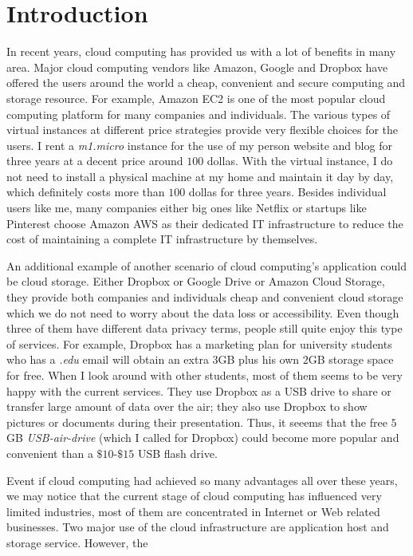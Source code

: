 \section{Introduction}
In recent years, cloud computing has provided us with a lot of benefits in many area. Major cloud computing vendors like Amazon, Google and Dropbox have offered the users around the world a cheap, convenient and secure computing and storage resource. For example, Amazon EC2 is one of the most popular cloud computing platform for many companies and individuals. The various types of virtual instances at different price strategies provide very flexible choices for the users. I rent a \emph{m1.micro} instance for the use of my person website and blog for three years at a decent price around $100$ dollas. With the virtual instance, I do not need to install a physical machine at my home and maintain it day by day, which definitely costs more than $100$ dollas for three years. Besides individual users like me, many companies either big ones like Netflix or startups like Pinterest choose Amazon AWS as their dedicated IT infrastructure to reduce the cost of maintaining a complete IT infrastructure by themselves. 

An additional example of another scenario of cloud computing's application could be cloud storage. Either Dropbox or Google Drive or Amazon Cloud Storage, they provide both companies and individuals cheap and convenient cloud storage which we do not need to worry about the data loss or accessibility. Even though three of them have different data privacy terms, people still quite enjoy this type of services. For example, Dropbox has a marketing plan for university students who has a \emph{.edu} email will obtain an extra $3$GB plus his own $2$GB storage space for free. When I look around with other students, most of them seems to be very happy with the current services. They use Dropbox as a USB drive to share or transfer large amount of data over the air; they also use Dropbox to show pictures or documents during their presentation. Thus, it seeems that the free $5$GB \emph{USB-air-drive} (which I called for Dropbox) could become more popular and convenient than a $\$10$-$\$15$ USB flash drive.

Event if cloud computing had achieved so many advantages all over these years, we may notice that the current stage of cloud computing has influenced very limited industries, most of them are concentrated in Internet or Web related businesses. Two major use of the cloud infrastructure are application host and storage service. However, the   


